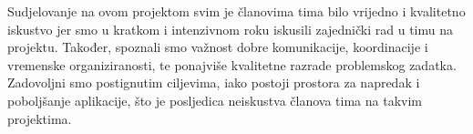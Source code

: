 		 \newline
		 \newline
		 \indent Sudjelovanje na ovom projektom svim je članovima tima bilo vrijedno i kvalitetno iskustvo jer smo u kratkom i intenzivnom roku iskusili zajednički rad u timu na projektu. Također, spoznali smo važnost dobre komunikacije, koordinacije i vremenske organiziranosti, te ponajviše kvalitetne razrade problemskog zadatka. Zadovoljni smo postignutim ciljevima, iako postoji prostora za napredak i poboljšanje aplikacije, što je posljedica neiskustva članova tima na takvim projektima.
		
		\eject 
